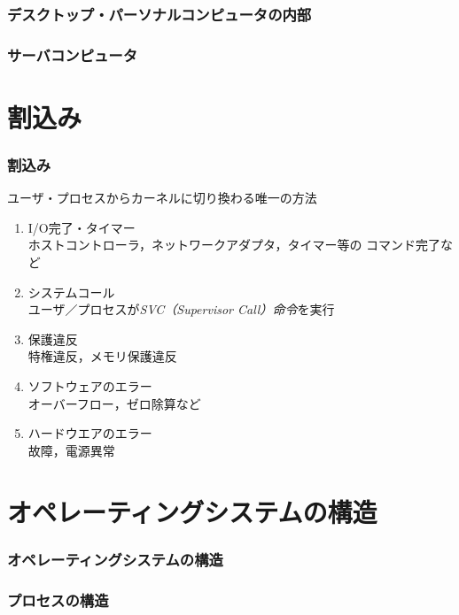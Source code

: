 \documentclass[unicode,handout]{beamer}                   %
\begin{document}
\begin{frame}
  \frametitle{デスクトップ・パーソナルコンピュータの内部}
\end{frame}

\begin{frame}
  \frametitle{サーバコンピュータ}
\end{frame}

\section{割込み}
\begin{frame}
  \frametitle{割込み}
  ユーザ・プロセスからカーネルに切り換わる唯一の方法
  \begin{enumerate}
    \item[1.] I/O完了・タイマー \\
      ホストコントローラ，ネットワークアダプタ，タイマー等の
      コマンド完了など
    \item[2.] システムコール \\
      ユーザ／プロセスが\emph{SVC（Supervisor Call）命令}を実行
    \item[3.] 保護違反 \\
      特権違反，メモリ保護違反
    \item[4.] ソフトウェアのエラー \\
      オーバーフロー，ゼロ除算など
    \item[5.] ハードウエアのエラー \\
      故障，電源異常
  \end{enumerate}
  \vfill
\end{frame}

\section{オペレーティングシステムの構造}
\begin{frame}
  \frametitle{オペレーティングシステムの構造}
\end{frame}

\begin{frame}
  \frametitle{プロセスの構造}
\end{frame}
\end{document}

